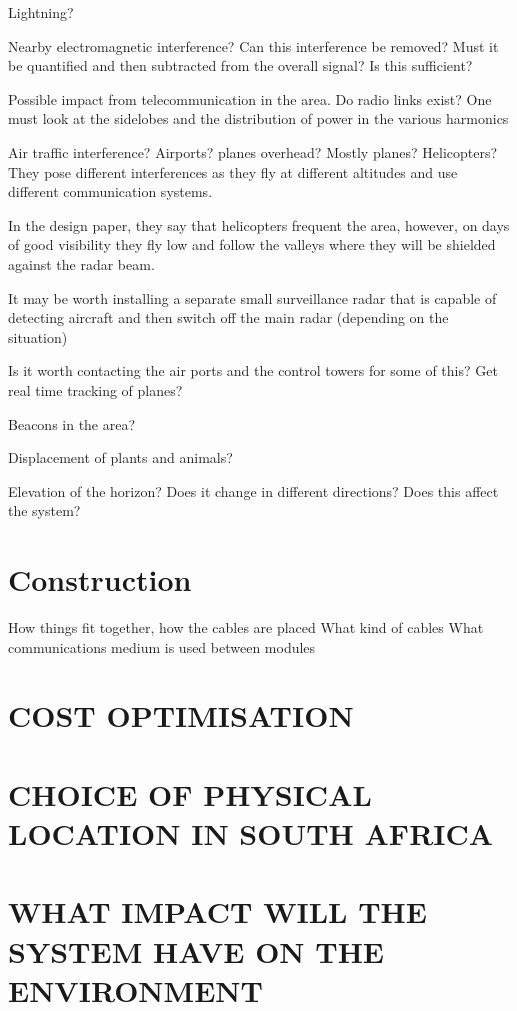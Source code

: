 \documentclass[11pt]{witseiepaper}
\begin{document}
Lightning?

Nearby electromagnetic interference?
Can this interference be removed? Must it be quantified and then subtracted from the overall signal? Is this sufficient?

Possible impact from telecommunication in the area. Do radio links exist? 
One must look at the sidelobes and the distribution of power in the various harmonics

Air traffic interference?
Airports? planes overhead?
Mostly planes? Helicopters? They pose different interferences as they fly at different altitudes and use different communication systems.

In the design paper, they say that helicopters frequent the area, however, on days of good visibility they fly low and follow the valleys where they will be shielded against the radar beam.

It may be worth installing a separate small surveillance radar that is capable of detecting aircraft and then switch off the main radar (depending on the situation)

Is it worth contacting the air ports and the control towers for some of this? Get real time tracking of planes?

Beacons in the area?

Displacement of plants and animals?

Elevation of the horizon? Does it change in different directions? Does this affect the system?


\section{Construction}

How things fit together, how the cables are placed
What kind of cables
What communications medium is used between modules



\section{COST OPTIMISATION}

\section{CHOICE OF PHYSICAL LOCATION IN SOUTH AFRICA}

\section{WHAT IMPACT WILL THE SYSTEM HAVE ON THE ENVIRONMENT}
\end{document}
